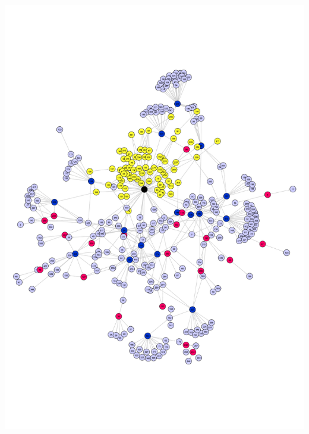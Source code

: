 \begin{frame}
\begin{columns}
\begin{column}{.55\textwidth}
      \includegraphics[width=\textwidth]{figures/net_reg_ecoli}
    \end{column}
  \end{columns}
\end{frame}

